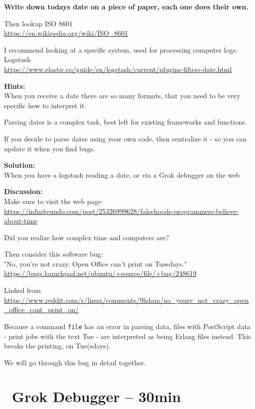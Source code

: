 \documentclass[a4paper,11pt,notitlepage]{report}
\begin{document}
{\bf Write down todays date on a piece of paper, each one does their own.}

Then lookup ISO 8601\\
\url{https://en.wikipedia.org/wiki/ISO_8601}

I recommend looking at a specific system, used for processing computer logs:
Logstash \\
\url{https://www.elastic.co/guide/en/logstash/current/plugins-filters-date.html}


{\bf Hints:}\\
When you receive a date there are so many formats, that you need to be very specific how to interpret it.

Parsing dates is a complex task, best left for existing frameworks and functions.

If you decide to parse dates using your own code, then centralize it - so you can update it when you find bugs.

{\bf Solution:}\\
When you have a logstash reading a date, or via a Grok debugger on the web

{\bf Discussion:}\\
Make sure to visit the web page:\\
\url{https://infiniteundo.com/post/25326999628/falsehoods-programmers-believe-about-time}

Did you realize how complex time and computers are?

Then consider this software bug:\\
"No, you're not crazy. Open Office can't print on Tuesdays."\\
\url{https://bugs.launchpad.net/ubuntu/+source/file/+bug/248619}

Linked from\\
{\footnotesize\url{https://www.reddit.com/r/linux/comments/9hdam/no_youre_not_crazy_open_office_cant_print_on/}}

Because a command \verb+file+ has an error in parsing data, files with PostScript data - print jobs with the text Tue - are interpreted as being Erlang files instead. This breaks the printing, on Tue(sdays).

We will go through this bug in detail together.


\chapter{\faInfoCircle\ Grok Debugger -- 30min}
\label{ex:grokdebugger1}
\end{document}
